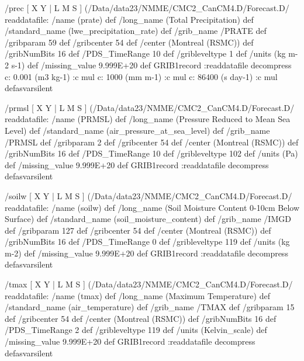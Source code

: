 \begin{ingrid}
/prec {
[ X Y | L M S ] (/Data/data23/NMME/CMC2_CanCM4.D/Forecast.D/%
readdatafile: 
/name (prate) def
/long_name (Total Precipitation) def
/standard_name (lwe_precipitation_rate) def
/grib_name /PRATE def
/gribparam 59 def
/gribcenter 54 def
/center (Montreal (RSMC)) def
/gribNumBits 16 def
/PDS_TimeRange 10 def
/gribleveltype 1 def
/units (kg m-2 s-1) def
/missing_value 9.999E+20 def
GRIB1record
:readdatafile decompress
  c:
   0.001 (m3 kg-1) :c
   mul
  c:
   1000 (mm m-1) :c
   mul
  c:
   86400 (s day-1) :c
   mul
} defasvarsilent

/prmsl {
[ X Y | L M S ] (/Data/data23/NMME/CMC2_CanCM4.D/Forecast.D/%
readdatafile: 
/name (PRMSL) def
/long_name (Pressure Reduced to Mean Sea Level) def
/standard_name (air_pressure_at_sea_level) def
/grib_name /PRMSL def
/gribparam 2 def
/gribcenter 54 def
/center (Montreal (RSMC)) def
/gribNumBits 16 def
/PDS_TimeRange 10 def
/gribleveltype 102 def
/units (Pa) def
/missing_value 9.999E+20 def
GRIB1record
:readdatafile decompress
} defasvarsilent

/soilw {
[ X Y | L M S ] (/Data/data23/NMME/CMC2_CanCM4.D/Forecast.D/%
readdatafile: 
/name (soilw) def
/long_name (Soil Moisture Content 0-10cm Below Surface) def
/standard_name (soil_moisture_content) def
/grib_name /IMGD def
/gribparam 127 def
/gribcenter 54 def
/center (Montreal (RSMC)) def
/gribNumBits 16 def
/PDS_TimeRange 0 def
/gribleveltype 119 def
/units (kg m-2) def
/missing_value 9.999E+20 def
GRIB1record
:readdatafile decompress
} defasvarsilent

/tmax {
[ X Y | L M S ] (/Data/data23/NMME/CMC2_CanCM4.D/Forecast.D/%
readdatafile: 
/name (tmax) def
/long_name (Maximum Temperature) def
/standard_name (air_temperature) def
/grib_name /TMAX def
/gribparam 15 def
/gribcenter 54 def
/center (Montreal (RSMC)) def
/gribNumBits 16 def
/PDS_TimeRange 2 def
/gribleveltype 119 def
/units (Kelvin_scale) def
/missing_value 9.999E+20 def
GRIB1record
:readdatafile decompress
} defasvarsilent


\end{ingrid}
